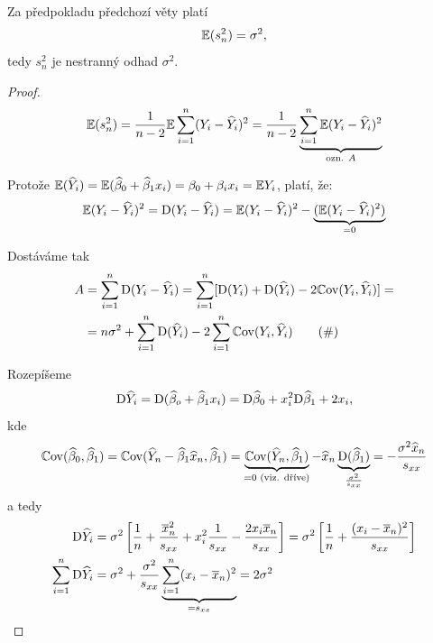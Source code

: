 \begin{theorem}
	Za předpokladu předchozí věty platí
	$$
		\mathbb{E} (s_n^2) = \sigma^2,
	$$
	tedy $s_n^2$ je nestranný odhad $\sigma^2$.
\end{theorem}


\begin{proof}
	$$
		\mathbb{E}(s_n^2)  = \frac{1}{n-2} \mathbb{E} \sum_{i=1}^{n} (Y_i - \widehat{Y}_i)^2 = \frac{1}{n-2} \underbrace{\sum\limits_{i=1}^{n} \mathbb{E} (Y_i - \widehat{Y}_i)^2}_{\text{ozn. } A}
	$$
	
	Protože $\mathbb{E}(\widehat{Y}_i)  = \mathbb{E}(\widehat{\beta}_0 + \widehat{\beta}_1 x_i) = \beta_0 + \beta_i x_i = \mathbb{E} Y_i$, platí, že:
	$$
	\mathbb{E}(Y_i - \widehat{Y}_i)^2   = \mathrm{D}(Y_i - \widehat{Y}_i) = \mathbb{E} (Y_i - \widehat{Y}_i)^2 - \underbrace{(\mathbb{E}(Y_i - \widehat{Y}_i)^2)}_{= 0}
	$$
	
	Dostáváme tak	
	\begin{align*}
		A & = \sum_{i=1}^{n} \mathrm{D}(Y_i - \widehat{Y}_i) = \sum_{i=1}^n [ \mathrm{D}(Y_i) + \mathrm{D}(\widehat{Y}_i) - 2 \mathbb{C}\mathrm{ov}(Y_i, \widehat{Y}_i) ] =  \\
		& = n \sigma^2 + \sum_{i=1}^n \mathrm{D}(\widehat{Y}_i) - 2 \sum_{i=1}^n \mathbb{C}\mathrm{ov}(Y_i, \widehat{Y}_i) \tag{$\#$}
	\end{align*}
	
	Rozepíšeme
	$$
		\mathrm{D} \widehat{Y}_i  = \mathrm{D}(\widehat{\beta}_o + \widehat{\beta}_1 x_i) = \mathrm{D} \widehat{\beta}_0 + x_i^2 \mathrm{D} \widehat{\beta}_1 + 2 x_i,
	$$
	kde
	$$
		\mathbb{C}\mathrm{ov}(\widehat{\beta}_0, \widehat{\beta}_1) = \mathbb{C}\mathrm{ov}(\widehat{Y}_n - \widehat{\beta}_1 \widehat{x}_n, \widehat{\beta}_1) = \underbrace{\mathbb{C}\mathrm{ov}(\widehat{Y}_n, \widehat{\beta}_1)}_{= 0 \text{ (viz. dříve)}} - \widehat{x}_n \underbrace{\mathrm{D}(\widehat{\beta}_1)}_{\frac{\sigma^2}{s_{xx}}} = -\frac{\sigma^2 \widehat{x}_n}{s_{xx}}
	$$
	a tedy
	\begin{align*}
		\mathrm{D} \widehat{Y}_i & = \sigma^2 \left[ \frac{1}{n} + \frac{\overline{x}_n^2}{s_{xx}} + x_i^2 \frac{1}{s_{xx}} - \frac{2 x_i \overline{x}_n}{s_{xx}} \right] = \sigma^2 \left[ \frac{1}{n} + \frac{(x_i - \overline{x}_n)^2}{s_{xx}}\right] \\
		\sum_{i=1}^n \mathrm{D} \widehat{Y}_i & = \sigma^2 + \frac{\sigma^2}{s_{xx}} \underbrace{\sum_{i=1}^n (x_i - \overline{x}_n)^2}_{ = s_{xx}} = 2\sigma^2
	\end{align*}
	

\end{proof}
